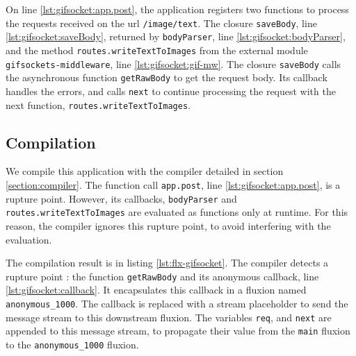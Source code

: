 On line \ref{lst:gifsocket:app.post}, the application registers two functions to process the requests received on the url \texttt{/image/text}.
The closure \texttt{saveBody}, line \ref{lst:gifsocket:saveBody}, returned by \texttt{bodyParser}, line \ref{lst:gifsocket:bodyParser}, and the method \texttt{routes.write\-Text\-To\-Images} from the external module \texttt{gifsockets-middleware}, line \ref{lst:gifsocket:gif-mw}.
The closure \texttt{saveBody} calls the asynchronous function \texttt{getRawBody} to get the request body.
Its callback handles the errors, and calls \texttt{next} to continue processing the request with the next function, \texttt{routes.write\-Text\-To\-Images}.



\subsection{Compilation}

We compile this application with the compiler detailed in section \ref{section:compiler}.
The function call \texttt{app.post}, line \ref{lst:gifsocket:app.post}, is a rupture point.
However, its callbacks, \texttt{bodyParser} and \texttt{routes.write\-Text\-To\-Images} are evaluated as functions only at runtime.
For this reason, the compiler ignores this rupture point, to avoid interfering with the evaluation.

The compilation result is in listing \ref{lst:flx-gifsocket}.
The compiler detects a rupture point : the function \texttt{getRawBody} and its anonymous callback, line \ref{lst:gifsocket:callback}.
It encapsulates this callback in a fluxion named \texttt{anonymous\-\_1000}.
The callback is replaced with a stream placeholder to send the message stream to this downstream fluxion.
The variables \texttt{req}, and \texttt{next} are appended to this message stream, to propagate their value from the \texttt{main} fluxion to the \texttt{anonymous\-\_1000} fluxion.

